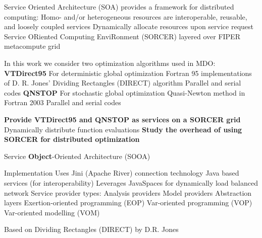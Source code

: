 
\bigskip \bigskip
Service Oriented Architecture (SOA) provides a framework for
distributed computing:
\bull Homo- and/or heterogeneous resources are interoperable, reusable,
	and loosely coupled services
\bull Dynamically allocate resources upon service request
\bull Service ORiented Computing EnviRonment (SORCER) layered over
	FIPER metacompute grid
\smallskip
\vbox{
}
\vfil
\eject

\bigskip \bigskip
In this work we consider two optimization algorithms used in MDO:
\bigskip
{\bf VTDirect95}
\bull For deterministic global optimization
\bull Fortran 95 implementations of D. R. Jones'
Dividing Rectangles (DIRECT) algorithm
\bull Parallel and serial codes
\bigskip
{\bf QNSTOP}
\bull For stochastic global optimization
\bull Quasi-Newton method in Fortran 2003
\bull Parallel and serial codes
\vfil\eject

\bigskip \bigskip \bigskip
{\bf Provide VTDirect95 and QNSTOP as services on a SORCER grid}
\medskip
\bull Dynamically distribute function evaluations
\bigskip \bigskip \bigskip
{\bf Study the overhead of using SORCER for distributed optimization}
\vfil \eject

\bigskip \bigskip
Service {\bf Object}-Oriented Architecture (SOOA)
\smallskip
{}
\vfil\eject

\bigskip \bigskip
Implementation
\bull Uses Jini (Apache River) connection technology
\bull Java based services (for interoperability)
\bull Leverages JavaSpaces for dynamically load balanced network
\bigskip
Service provider types:
\bull Analysis providers
\bull Model providers
\bigskip
Abstraction layers 
\bull Exertion-oriented programming (EOP)
\bull Var-oriented programming (VOP)
\bull Var-oriented modelling (VOM)
\vfil\eject

\bigskip \bigskip
Based on Dividing Rectangles (DIRECT) by D.R. Jones 
\smallskip
{}
\vfil\eject

